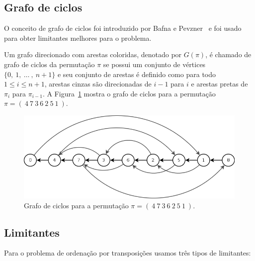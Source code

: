 \subsection{Grafo de ciclos}
\label{subsec:trans_cycle_graph}
O conceito de grafo de ciclos foi introduzido por Bafna e
Pevzner~\cite{BafnaPevzner*1998} e foi usado para obter limitantes
melhores para o problema.

Um grafo direcionado com arestas coloridas, denotado por $G(\pi)$, é
chamado de grafo de ciclos da permutação $\pi$ se possui um conjunto
de vértices $\{0,~1,~\ldots~,~n+1\}$ e seu conjunto de arestas é
definido como para todo $1 \leq i \leq n+1$, arestas cinzas são
direcionadas de $i-1$ para $i$ e arestas pretas de $\pi_{i}$ para
$\pi_{i-1}$. A Figura~\ref{fig:trans_cycle_graph} mostra o grafo de
ciclos para a permutação $\pi = (~4~7~3~6~2~5~1~)$.

\begin{figure}[h]
  \centering 
  \includegraphics[scale=0.6]{images/trans_cycle_graph.png} 
  \caption{Grafo de ciclos para a permutação $\pi = (~4~7~3~6~2~5~1~)$.}
  \label{fig:trans_cycle_graph}
\end{figure}

\subsection{Limitantes}
\label{subsec:trans_limitantes}
Para o problema de ordenação por transposições usamos três tipos de
limitantes:

